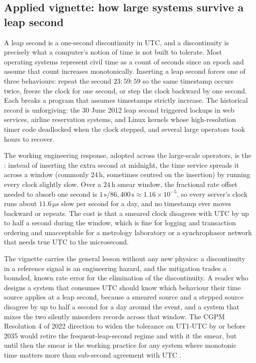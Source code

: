 \subsection{Applied vignette: how large systems survive a leap
second}

A leap second is a one-second discontinuity in UTC, and a
discontinuity is precisely what a computer's notion of time is not
built to tolerate. Most operating systems represent civil time as a
count of seconds since an epoch and assume that count increases
monotonically. Inserting a leap second forces one of three
behaviours: repeat the second $23{:}59{:}59$ so the same timestamp
occurs twice, freeze the clock for one second, or step the clock
backward by one second. Each breaks a program that assumes
timestamps strictly increase. The historical record is unforgiving:
the 30 June 2012 leap second triggered lockups in web services,
airline reservation systems, and Linux kernels whose high-resolution
timer code deadlocked when the clock stepped, and several large
operators took hours to recover.

The working engineering response, adopted across the large-scale
operators, is the : instead of inserting the
extra second at midnight, the time service spreads it across a
window (commonly $24 \,\si{\hour}$, sometimes centred on the
insertion) by running every clock slightly slow. Over a
$24 \,\si{\hour}$ smear window, the fractional rate offset needed to
absorb one second is $1 \,\si{\second} / 86{,}400 \,\si{\second}
\approx 1.16 \times 10^{-5}$, so every server's clock runs about
$11.6 \,\si{\micro\second}$ slow per second for a day, and no
timestamp ever moves backward or repeats. The cost is that a smeared
clock disagrees with UTC by up to half a second during the window,
which is fine for logging and transaction ordering and unacceptable
for a metrology laboratory or a synchrophasor network that needs
true UTC to the microsecond.

The vignette carries the general lesson without any new physics: a
discontinuity in a reference signal is an engineering hazard, and the
mitigation trades a bounded, known rate error for the elimination of
the discontinuity. A reader who designs a system that consumes UTC
should know which behaviour their time source applies at a leap
second, because a smeared source and a stepped source disagree by up
to half a second for a day around the event, and a system that mixes
the two silently misorders records across that window. The
CGPM Resolution 4 of 2022 direction to widen the tolerance on
UT1-UTC by or before 2035 would retire the frequent-leap-second
regime and with it the smear, but until then the smear is the
working practice for any system where monotonic time matters more
than sub-second agreement with UTC \cite{web:nist-leap-seconds}.


